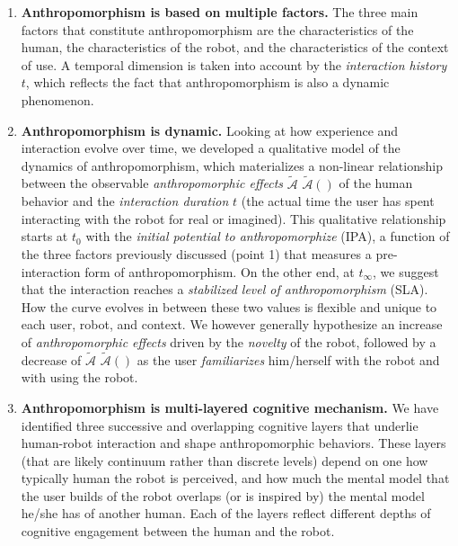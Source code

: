 \documentclass{frontiersSCNS} %
\newcommand{\AntE}[1][]{%
      \ifthenelse{\isempty{#1}}%
      {$\widetilde{\mathcal{A}}$}
      {$\widetilde{\mathcal{A}}(#1)$}
}
\begin{document}
\begin{enumerate}

\item \textbf{Anthropomorphism is based on multiple factors.} The three main
    factors that constitute anthropomorphism are the characteristics of the
    human, the characteristics of the robot, and the characteristics of the
    context of use. A temporal dimension is taken into account by the
    \textit{interaction history} $t$, which reflects the fact that
    anthropomorphism is also a dynamic phenomenon.

\item \textbf{Anthropomorphism is dynamic.} Looking at how experience and
    interaction evolve over time, we developed a qualitative model of the
    dynamics of anthropomorphism, which materializes a non-linear relationship
    between the observable \textit{anthropomorphic effects} \AntE of the human
    behavior and the \textit{interaction duration} $t$ (the actual time the user
    has spent interacting with the robot for real or imagined). This qualitative
    relationship starts at $t_{0}$ with the \textit{initial potential to
    anthropomorphize} (IPA), a function of the three factors previously
    discussed (point 1) that measures a pre-interaction form of
    anthropomorphism. On the other end, at $t_{\infty}$, we suggest that the
    interaction reaches a \textit{stabilized level of anthropomorphism} (SLA).
    How the curve evolves in between these two values is flexible and unique to
    each user, robot, and context. We however generally hypothesize an increase of
    \textit{anthropomorphic effects} driven by the \textit{novelty} of the
    robot, followed by a decrease of \AntE as the user \textit{familiarizes}
    him/herself with the robot and with using the robot. 

\item \textbf{Anthropomorphism is multi-layered cognitive mechanism.} We have
    identified three successive and overlapping cognitive layers that underlie
    human-robot interaction and shape anthropomorphic behaviors.
    These layers (that are likely continuum rather than discrete levels) depend
    on one how typically human the robot is perceived, and how much the mental
    model that the user builds of the robot overlaps (or is inspired by) the
    mental model he/she has of another human. Each of the layers
    reflect different depths of cognitive engagement between the human and the
    robot.

\end{enumerate}
\end{document}

